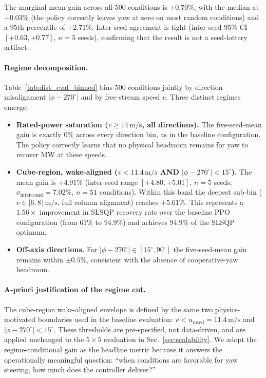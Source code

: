 \documentclass[final,5p,times]{elsarticle}
\begin{document}
The marginal mean gain across all $500$ conditions is $+0.70\%$, with the median at $+0.03\%$ (the policy correctly leaves yaw at zero on most random conditions) and a $95$th percentile of $+2.71\%$. Inter-seed agreement is tight (inter-seed $95\%$ CI $[+0.63,+0.77]$, $n{=}5$ seeds), confirming that the result is not a seed-lottery artifact.

\paragraph{Regime decomposition.}
Table~\ref{tab:dist_eval_binned} bins $500$ conditions jointly by direction misalignment $|\phi-270^\circ|$ and by free-stream speed $v$. Three distinct regimes emerge:
\begin{itemize}
\item \textbf{Rated-power saturation ($v\!\geq\!14\,\mathrm{m/s}$, all directions).} The five-seed-mean gain is exactly $0\%$ across every direction bin, as in the baseline configuration. The policy correctly learns that no physical headroom remains for yaw to recover MW at these speeds.
\item \textbf{Cube-region, wake-aligned ($v\!<\!11.4\,\mathrm{m/s}$ AND $|\phi\!-\!270^\circ|\!<\!15^\circ$).} The mean gain is $\mathbf{+4.91\%}$ (inter-seed range $[+4.80,+5.01]$, $n\!=\!5$ seeds; $\sigma_\mathrm{inter\text{-}cond}\!=\!7.02\%$, $n\!=\!51$ conditions). Within this band the deepest sub-bin ($v\!\in\![6,8)\,\mathrm{m/s}$, full column alignment) reaches $+5.61\%$. This represents a $1.56{\times}$ improvement in SLSQP recovery rate over the baseline PPO configuration (from $61\%$ to $94.9\%$) and achieves $94.9\%$ of the SLSQP optimum.
\item \textbf{Off-axis directions.} For $|\phi\!-\!270^\circ|\!\in\![15^\circ,90^\circ]$ the five-seed-mean gain remains within $\pm0.5\%$, consistent with the absence of cooperative-yaw headroom.
\end{itemize}

\paragraph{A-priori justification of the regime cut.}
The cube-region wake-aligned envelope is defined by the same two physics-motivated boundaries used in the baseline evaluation: $v\!<\!u_\mathrm{rated}\!=\!11.4\,\mathrm{m/s}$ and $|\phi\!-\!270^\circ|\!<\!15^\circ$. These thresholds are pre-specified, not data-driven, and are applied unchanged to the $5{\times}5$ evaluation in Sec.~\ref{sec:scalability}. We adopt the regime-conditional gain as the headline metric because it answers the operationally meaningful question: ``when conditions are favorable for yaw steering, how much does the controller deliver?''
\end{document}
